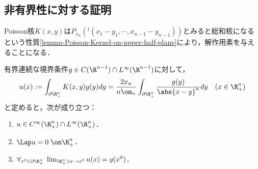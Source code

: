 \documentclass[uplatex,dvipdfmx]{jsreport}
\begin{document}
\subsection{非有界性に対する証明}

\begin{tcolorbox}[colframe=ForestGreen, colback=ForestGreen!10!white,breakable,colbacktitle=ForestGreen!40!white,coltitle=black,fonttitle=\bfseries\sffamily,
title=]
    Poisson核$K(x,y)$は$P_{x_n}({}^t\!(x_1-y_1,\cdots,x_{n-1}-y_{n-1}))$とみると総和核になるという性質\ref{lemma-Poisson-Kernel-on-upper-half-plane}により，解作用素を与えることになる．
\end{tcolorbox}

\begin{theorem}[上半平面上のLaplace方程式のDirichlet問題の解]
    有界連続な境界条件$g\in C(\R^{n-1})\cap L^\infty(\R^{n-1})$に対して，
    \[u(x):=\int_{\partial\R^n_+}K(x,y)g(y)dy=\frac{2x_n}{n\om_n}\int_{\partial\R^n_+}\frac{g(y)}{\abs{x-y}^n}dy\quad(x\in\R^n_+)\]
    と定めると，次が成り立つ：
    \begin{enumerate}
        \item $u\in C^\infty(\R^n_+)\cap L^\infty(\R^n_+)$．
        \item $\Lap u=0\;\on\R^n_+$．
        \item $\forall_{x^0\in\partial\R^n_+}\;\lim_{\R^n_+\ni x\to x^0}u(x)=g(x^0)$．
    \end{enumerate}
\end{theorem}
\end{document}
